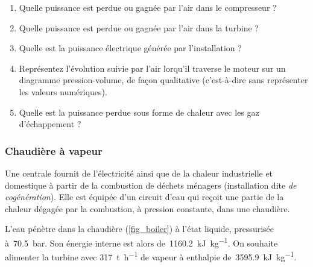 	\begin{enumerate}
		\item Quelle puissance est perdue ou gagnée par l’air dans le compresseur ?
		\item Quelle puissance est perdue ou gagnée par l’air dans la turbine ?
		\item Quelle est la puissance électrique générée par l’installation ?
		\item Représentez l’évolution suivie par l’air lorqu’il traverse le moteur sur un diagramme pression-volume, de façon qualitative (c’est-à-dire sans représenter les valeurs numériques).
		\item Quelle est la puissance perdue sous forme de chaleur avec les gaz d’échappement ?\\
	\end{enumerate}


\subsubsection{Chaudière à vapeur}
\label{exo_chaudiere_vapeur}

	Une centrale fournit de l’électricité ainsi que de la chaleur industrielle et domestique à partir de la combustion de déchets ménagers (installation dite \textit{de cogénération}). Elle est équipée d’un circuit d’eau qui reçoit une partie de la chaleur dégagée par la combustion, à pression constante, dans une chaudière.
	
	L’eau pénètre dans la chaudière (\cref{fig_boiler}) à l’état liquide, pressurisée à~\SI{70,5}{\bar}. Son énergie interne est alors de~\SI{1160,2}{\kilo\joule\per\kilogram}. On souhaite alimenter la turbine avec \SI{317}{\tonne\per\hour} de vapeur à enthalpie de~\SI{3595,9}{\kilo\joule\per\kilogram}.

